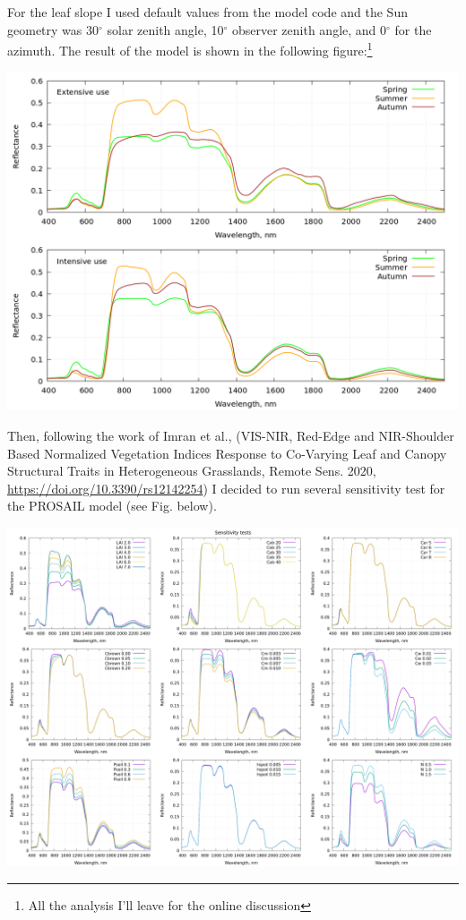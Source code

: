 \documentclass[a4paper,12pt]{article}
\begin{document}
For the leaf slope I used default values from the model code and the Sun geometry was 30$^{\circ}$ solar zenith angle, 10$^{\circ}$  observer zenith angle, and 0$^{\circ}$ for the azimuth. The result of the model is shown in the following figure:\footnote{All the analysis I'll leave for the online discussion}

\begin{center}
	\includegraphics[width=0.7\linewidth]{../plt/intensive-extensive_grasslands.png} \\
\end{center}

Then, following the work of Imran et al., (VIS-NIR, Red-Edge and NIR-Shoulder Based Normalized Vegetation Indices Response to Co-Varying Leaf and Canopy Structural Traits in Heterogeneous Grasslands, Remote Sens. 2020, \url{https://doi.org/10.3390/rs12142254}) I decided to run several sensitivity test for the PROSAIL model (see Fig. below).

\begin{center}
	\includegraphics[width=0.9\linewidth]{../plt/sensitivity_tests.png} \\
\end{center}
\end{document}
